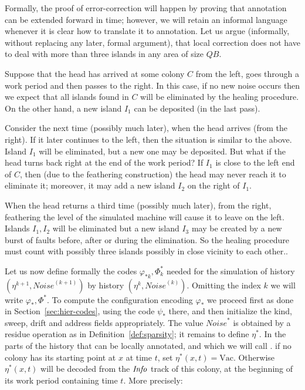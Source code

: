 \documentclass[11pt]{memoir}
\theoremstyle{definition} %
\newcommand{\fld}[1]{\ensuremath{\textit{#1\/}}}
\def\B{B}
\newcommand{\Noise}{\mathit{Noise}}
\newcommand{\Q}{Q} %
\newcommand{\Info}{\fld{Info}}
\newcommand{\Vacant}{\mathrm{Vac}}
\begin{document}
Formally, the proof of error-correction will happen by proving that
annotation can be extended forward in time; however, we will retain an informal language
whenever it is clear how to translate it to annotation.
Let us argue (informally, without replacing any later, formal argument), that local correction
does not have to deal with more than three islands in any area of size \( \Q\B \). 

\begin{example}\label{xmp:3-islands}
  Suppose that the head has arrived at some colony \( C \) from the left,
goes through a work period and then passes to the right.
In this case, if no new noise occurs then we expect that
all islands found in \( C \) will be eliminated by the healing procedure.
On the other hand, a new island \( I_{1} \) can be deposited (in the last pass).

Consider the next time (possibly much later), when the head arrives (from the right).
If it later continues to the left, then the situation is similar to the above.
Island \( I_{1} \) will be eliminated, but a new one may be deposited.
But what if the head turns back right at the end of the work period?
If \( I_{1} \) is close to the left end of \( C \), then (due to the feathering
construction) the head may never reach it to eliminate it; moreover,
it may add a new island \( I_{2} \) on the right of \( I_{1} \).

When the head returns a third time (possibly much later), 
from the right, feathering the level of the simulated machine will
cause it to leave on the left.
Islands \( I_{1},I_{2} \) will be eliminated but a new island
\( I_{3} \) may be created by a new burst of faults before, after or during the elimination.
So the healing procedure must count with possibly three islands
possibly in close vicinity to each other..
\end{example}

Let us now define formally the codes \( \varphi_{*k},\Phi_{k}^{*} \) needed
for the simulation of history \( (\eta^{k+1},\Noise^{(k+1)}) \) by history \( (\eta^{k},\Noise^{(k)}) \).
Omitting the index \( k \) we will write \( \varphi_{*},\Phi^{*} \).
To compute the configuration encoding \( \varphi_{*} \) we proceed first as
done in Section~\ref{sec:hier-codes}, using the code \( \psi_{*} \) there,
and then initialize the kind, sweep, drift and address fields appropriately.
The value \( \Noise^{*} \) is obtained by a residue operation
as in Definition~\ref{def:sparsity}; it remains to define \( \eta^{*} \).
In the parts of the history that can be locally annotated, and which we will call .
if no colony has its starting point at \( x \) at time \( t \), set \( \eta^{*}(x,t)=\Vacant \).
Otherwise \( \eta^{*}(x,t) \) will be decoded from
the \( \Info \) track of this colony, at the beginning of its work period 
containing time \( t \).
More precisely:
\end{document}
